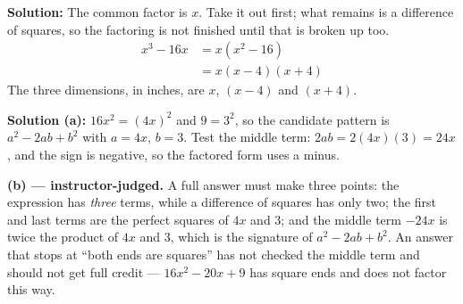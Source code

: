 \documentclass[12pt]{article}
\begin{document}
\textbf{Solution:} The common factor is $x$. Take it out first; what remains is a difference of squares, so the factoring is not finished until that is broken up too.
\begin{align*}
  x^3 - 16x &= x(x^2 - 16) \\
            &= x(x-4)(x+4)
\end{align*}
The three dimensions, in inches, are $x$, $(x-4)$ and $(x+4)$. 


\textbf{Solution (a):} $16x^2 = (4x)^2$ and $9 = 3^2$, so the candidate pattern is $a^2 - 2ab + b^2$ with $a = 4x$, $b = 3$. Test the middle term: $2ab = 2(4x)(3) = 24x$, and the sign is negative, so the factored form uses a minus. 

\textbf{(b) --- instructor-judged.} A full answer must make three points: the expression has \emph{three} terms, while a difference of squares has only two; the first and last terms are the perfect squares of $4x$ and $3$; and the middle term $-24x$ is twice the product of $4x$ and $3$, which is the signature of $a^2 - 2ab + b^2$. An answer that stops at ``both ends are squares'' has not checked the middle term and should not get full credit --- $16x^2 - 20x + 9$ has square ends and does not factor this way.
\end{document}
